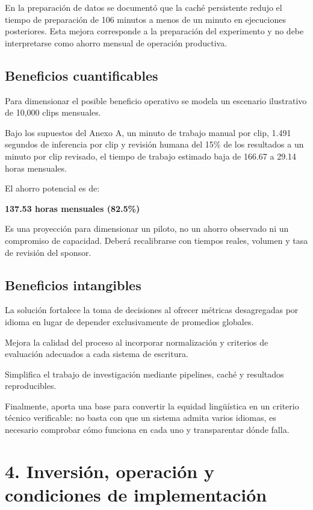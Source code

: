 \documentclass[letterpaper,11pt]{article}
\begin{document}
En la preparación de datos se documentó que la caché
persistente redujo el tiempo de preparación de 106 minutos
a menos de un minuto en ejecuciones posteriores.
Esta mejora corresponde a la preparación del experimento
y no debe interpretarse como ahorro mensual de operación
productiva.

\subsection*{Beneficios cuantificables}

Para dimensionar el posible beneficio operativo se modela
un escenario ilustrativo de 10,000 clips mensuales.

Bajo los supuestos del Anexo A, un minuto de trabajo manual
por clip, 1.491 segundos de inferencia por clip y revisión
humana del 15\% de los resultados a un minuto por clip
revisado, el tiempo de trabajo estimado baja de 166.67
a 29.14 horas mensuales.

El ahorro potencial es de:

\begin{center}
{\Large\bfseries\color{azul}
137.53 horas mensuales (82.5\%)
}
\end{center}

Es una proyección para dimensionar un piloto, no un ahorro
observado ni un compromiso de capacidad. Deberá recalibrarse
con tiempos reales, volumen y tasa de revisión del sponsor.

\subsection*{Beneficios intangibles}

La solución fortalece la toma de decisiones al ofrecer
métricas desagregadas por idioma en lugar de depender
exclusivamente de promedios globales.

Mejora la calidad del proceso al incorporar normalización
y criterios de evaluación adecuados a cada sistema de escritura.

Simplifica el trabajo de investigación mediante pipelines,
caché y resultados reproducibles.

Finalmente, aporta una base para convertir la equidad
lingüística en un criterio técnico verificable: no basta
con que un sistema admita varios idiomas, es necesario
comprobar cómo funciona en cada uno y transparentar dónde falla.

\section*{\color{azul}4. Inversión, operación y condiciones
de implementación}
\end{document}

